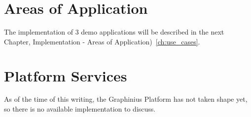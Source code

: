 	
\section{Areas of Application}
\label{sect:aoas}

The implementation of 3 demo applications will be described in the next Chapter, Implementation - Areas of Application)~\ref{ch:use_cases}.
	
\section{Platform Services}
\label{sect:platform_services}

As of the time of this writing, the Graphinius Platform has not taken shape yet, so there is no available implementation to discuss.



